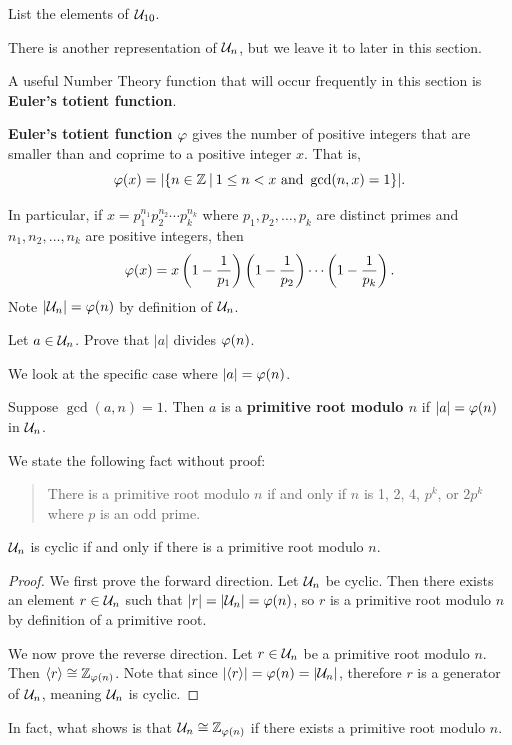 \begin{exercise}
    List the elements of $\mathcal{U}_{10}$.
\end{exercise}

There is another representation of $\mathcal{U}_{n}$, but we leave it to later in this section.

A useful Number Theory function that will occur frequently in this section is \textbf{Euler's totient function}.

\begin{definition}
    \textbf{Euler's totient function} $\varphi$ gives the number of positive integers that are smaller than and coprime to a positive integer $x$. That is,
    \[
        \totient(x) = |\{n \in \mathbb{Z} \vert 1 \leq n < x \text{ and } \gcd(n, x) = 1\}|.
    \]
\end{definition}
In particular, if $x = p_1^{n_1}p_2^{n_2}\cdots p_k^{n_k}$ where $p_1, p_2,\dots,p_k$ are distinct primes and $n_1,n_2,\dots,n_k$ are positive integers, then
\[
    \varphi(x) = x \left(1 - \frac1{p_1}\right)\left(1 - \frac1{p_2}\right)\cdots\left(1 - \frac1{p_k}\right).
\]
Note $|\mathcal{U}_{n}| = \varphi(n)$ by definition of $\mathcal{U}_{n}$.

\begin{exercise}\label{exercise-order-of-a-divides-phi-a}
    Let $a \in \mathcal{U}_{n}$. Prove that $|a|$ divides $\varphi(n)$.
\end{exercise}

We look at the specific case where $|a| = \varphi(n)$.
\begin{definition}
    Suppose $\gcd(a, n) = 1$. Then $a$ is a \textbf{primitive root modulo $n$} if $|a| = \varphi(n)$ in $\mathcal{U}_{n}$.
\end{definition}
We state the following fact without proof:
\begin{quote}
    There is a primitive root modulo $n$ if and only if $n$ is 1, 2, 4, $p^k$, or $2p^k$ where $p$ is an odd prime.
\end{quote}

\begin{proposition}\label{prop-Un-cyclic-only-if-exists-primitive-root}
    $\mathcal{U}_{n}$ is cyclic if and only if there is a primitive root modulo $n$.
\end{proposition}
\begin{proof}
    We first prove the forward direction. Let $\mathcal{U}_{n}$ be cyclic. Then there exists an element $r \in \mathcal{U}_{n}$ such that $|r| = |\mathcal{U}_{n}| = \varphi(n)$, so $r$ is a primitive root modulo $n$ by definition of a primitive root.

    We now prove the reverse direction. Let $r \in \mathcal{U}_{n}$ be a primitive root modulo $n$. Then $\langle r \rangle \cong \mathbb{Z}_{\varphi(n)}$. Note that since $|\langle r \rangle| = \varphi(n) = |\mathcal{U}_{n}|$, therefore $r$ is a generator of $\mathcal{U}_{n}$, meaning $\mathcal{U}_{n}$ is cyclic.
\end{proof}
\begin{remark}
    In fact, what  shows is that $\mathcal{U}_{n} \cong \mathbb{Z}_{\varphi(n)}$ if there exists a primitive root modulo $n$.
\end{remark}

